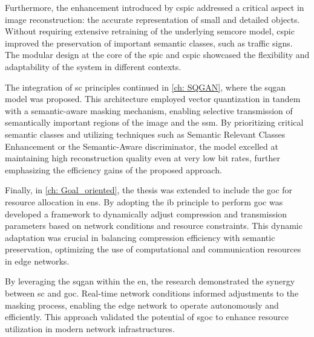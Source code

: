 Furthermore, the enhancement introduced by \gls{cspic} addressed a critical aspect in image reconstruction: the accurate representation of small and detailed objects. Without requiring extensive retraining of the underlying \gls{semcore} model, \gls{cspic} improved the preservation of important semantic classes, such as traffic signs.  The modular design at the core of the \gls{spic} and \gls{cspic} showcased the flexibility and adaptability of the system in different contexts.

The integration of \gls{sc} principles continued in \cref{ch: SQGAN}, where the \gls{sqgan} model was proposed. This architecture employed vector quantization in tandem with a semantic-aware masking mechanism, enabling selective transmission of semantically important regions of the image and the \gls{ssm}. By prioritizing critical semantic classes and utilizing techniques such as Semantic Relevant Classes Enhancement or the Semantic-Aware discriminator, the model excelled at maintaining high reconstruction quality even at very low bit rates, further emphasizing the efficiency gains of the proposed approach.

Finally, in \cref{ch: Goal_oriented}, the thesis was extended to include the \gls{goc} for resource allocation in \glspl{en}. By adopting the \gls{ib} principle to perform \gls{goc} was developed a framework to dynamically adjust compression and transmission parameters based on network conditions and resource constraints. This dynamic adaptation was crucial in balancing compression efficiency with semantic preservation, optimizing the use of computational and communication resources in edge networks.

By leveraging the \gls{sqgan} within the \gls{en}, the research demonstrated the synergy between \gls{sc} and \gls{goc}. Real-time network conditions informed adjustments to the masking process, enabling the edge network to operate autonomously and efficiently. This approach validated the potential of \gls{sgoc} to enhance resource utilization in modern network infrastructures.




